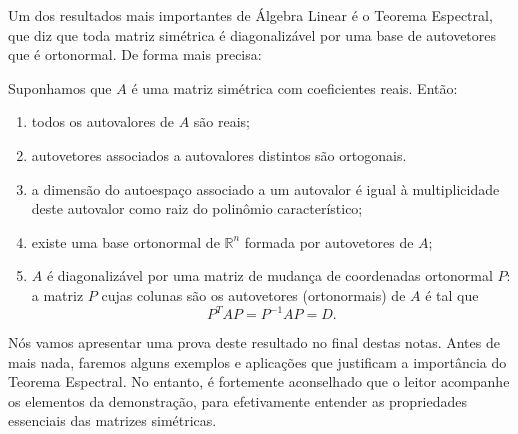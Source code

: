 \documentclass[../livro.tex]{subfiles}
\begin{document}
Um dos resultados mais importantes de Álgebra Linear é o Teorema Espectral, que diz que toda matriz simétrica é diagonalizável por uma base de autovetores que é ortonormal. De forma mais precisa:

\begin{teoespectral}
	Suponhamos que $A$ é uma matriz simétrica com coeficientes reais. Então:
	\begin{enumerate}[$(i)$]
		\item todos os autovalores de $A$ são reais;
		\item autovetores associados a autovalores distintos são ortogonais.
		\item a dimensão do autoespaço associado a um autovalor é igual à multiplicidade deste autovalor como raiz do polinômio característico;
		\item existe uma base ortonormal de $\mathbb{R}^n$ formada por autovetores de $A$;
		\item $A$ é diagonalizável por uma matriz de mudança de coordenadas ortonormal $P$: a matriz $P$ cujas colunas são os autovetores (ortonormais) de $A$ é tal que 
		\begin{equation}
		P^{T} A P = P^{-1} A P = D.
		\end{equation}
	\end{enumerate}
\end{teoespectral}

Nós vamos apresentar uma prova deste resultado no final destas notas. Antes de mais nada, faremos alguns exemplos e aplicações que justificam a importância do Teorema Espectral. No entanto, é fortemente aconselhado que o leitor acompanhe os elementos da demonstração, para efetivamente entender as propriedades essenciais das matrizes simétricas.
\end{document}
